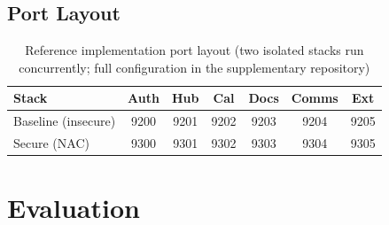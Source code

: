 \documentclass[journal]{IEEEtran}
\begin{document}
\subsection{Port Layout}

\begin{table}[h]
\caption{Reference implementation port layout (two isolated stacks
run concurrently; full configuration in the supplementary repository)}
\label{tab:ports}
\centering
\footnotesize
\begin{tabular}{lcccccc}
\toprule
\textbf{Stack} & \textbf{Auth} & \textbf{Hub} & \textbf{Cal}
               & \textbf{Docs} & \textbf{Comms} & \textbf{Ext} \\
\midrule
Baseline (insecure) & 9200 & 9201 & 9202 & 9203 & 9204 & 9205 \\
Secure (NAC)        & 9300 & 9301 & 9302 & 9303 & 9304 & 9305 \\
\bottomrule
\end{tabular}
\end{table}


\section{Evaluation}
\label{sec:eval}
\end{document}
